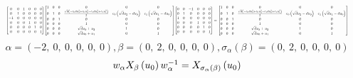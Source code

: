 \documentclass[11pt]{article}
\theoremstyle{definition}
\begin{document}
\[
\scaletoalign{\textwidth}{{\left[\begin{matrix}0 & 0 & 1 & 0 & 0 & 0\\0 & 1 & 0 & 0 & 0 & 0\\-1 & 0 & 0 & 0 & 0 & 0\\0 & 0 & 0 & 1 & 0 & 0\\0 & 0 & 0 & 0 & 1 & 0\\0 & 0 & 0 & 0 & 0 & 1\end{matrix}\right]} {\left[\begin{matrix}1 & 0 & 0 & 0 & 0 & 0\\0 & 1 & 0 & \frac{\sqrt{d} \left(- c_{0} d u_{3}^{2} + c_{0} u_{2}^{2} - c_{1} d u_{0}^{2} + c_{1} u_{1}^{2}\right)}{2} & c_{0} \left(\sqrt{d} u_{2} - d u_{3}\right) & c_{1} \left(\sqrt{d} u_{1} - d u_{0}\right)\\0 & 0 & 1 & 0 & 0 & 0\\0 & 0 & 0 & 1 & 0 & 0\\0 & 0 & 0 & \sqrt{d} u_{3} + u_{2} & 1 & 0\\0 & 0 & 0 & \sqrt{d} u_{0} + u_{1} & 0 & 1\end{matrix}\right]} {\left[\begin{matrix}0 & 0 & -1 & 0 & 0 & 0\\0 & 1 & 0 & 0 & 0 & 0\\1 & 0 & 0 & 0 & 0 & 0\\0 & 0 & 0 & 1 & 0 & 0\\0 & 0 & 0 & 0 & 1 & 0\\0 & 0 & 0 & 0 & 0 & 1\end{matrix}\right]} = {\left[\begin{matrix}1 & 0 & 0 & 0 & 0 & 0\\0 & 1 & 0 & \frac{\sqrt{d} \left(- c_{0} d u_{3}^{2} + c_{0} u_{2}^{2} - c_{1} d u_{0}^{2} + c_{1} u_{1}^{2}\right)}{2} & c_{0} \left(\sqrt{d} u_{2} - d u_{3}\right) & c_{1} \left(\sqrt{d} u_{1} - d u_{0}\right)\\0 & 0 & 1 & 0 & 0 & 0\\0 & 0 & 0 & 1 & 0 & 0\\0 & 0 & 0 & \sqrt{d} u_{3} + u_{2} & 1 & 0\\0 & 0 & 0 & \sqrt{d} u_{0} + u_{1} & 0 & 1\end{matrix}\right]}}
\]
\[
\alpha = \left( -2, \  0, \  0, \  0, \  0, \  0\right), \beta = \left( 0, \  2, \  0, \  0, \  0, \  0\right), \sigma_{\alpha}(\beta) = \left( 0, \  2, \  0, \  0, \  0, \  0\right)
\]
\[
\scaletoalign{\textwidth}{w_{\alpha} X_{\beta}\left(u_{0}\right) w_{\alpha}^{-1} = X_{\sigma_{\alpha}\left(\beta\right)}\left(u_{0}\right)}
\]
\end{document}
